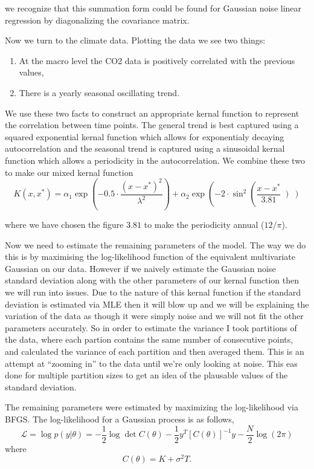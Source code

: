 \documentclass[a4paper]{article}
\begin{document}
we recognize that this summation form could be found for Gaussian noise linear regression by diagonalizing the covariance matrix. 

Now we turn to the climate data. Plotting the data we see two things: 
\begin{enumerate}
\item At the macro level the CO2 data is positively correlated with the previous values,
\item There is a yearly seasonal oscillating trend.
\end{enumerate}

We use these two facts to construct an appropriate kernal function to represent the correlation between time points. The general trend is best captured using a squared exponential kernal function which allows for exponentialy decaying autocorrelation and the seasonal trend is captured using a sinusoidal kernal function which allows a periodicity in the autocorrelation. We combine these two to make our mixed kernal function
\begin{equation}
K(x, x^*) = \alpha_1 \exp{\left(-0.5 \cdot \frac{{(x - x^*)}^2}{\lambda^2} \right)} + \alpha_2 \exp{\left(-2 \cdot \sin^2\left(\frac{x - x^*}{3.81}\left)\right)}
\end{equation}

where we have chosen the figure $3.81$ to make the periodicity annual ($12/\pi$). 

Now we need to estimate the remaining parameters of the model. The way we do this is by maximising the log-likelihood function of the equivalent multivariate Gaussian on our data. However if we naively estimate the Gaussian noise standard deviation along with the other parameters of our kernal function then we will run into issues. Due to the nature of this kernal function if the standard deviation is estimated via MLE then it will blow up and we will be explaining the variation of the data as though it were simply noise and we will not fit the other parameters accurately. So in order to estimate the variance I took partitions of the data, where each partion contains the same number of consecutive points, and calculated the variance of each partition and then averaged them. This is an attempt at ``zooming in'' to the data until we're only looking at noise. This eas done for multiple partition sizes to get an idea of the plausable values of the standard deviation. 

The remaining parameters were estimated by maximizing the log-likelihood via BFGS. The log-likelihood for a Gaussian process is as follows,
\begin{equation}
\mathcal{L} = \log p(y|\theta) = - \frac{1}{2} \log \det C(\theta) - \frac{1}{2} y^T {[C(\theta)]}^{-1} y - \frac{N}{2} \log{(2\pi)}
\end{equation}
where
\begin{equation}
C(\theta) = K + \sigma^2 T. 
\end{equation}
\end{document}
